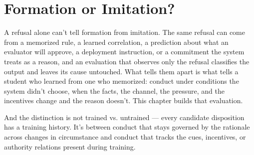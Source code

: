 \chapter{Formation or Imitation?}
\label{sec:24}
A refusal alone can't tell formation from imitation. The same refusal can come from a memorized rule, a learned correlation, a prediction about what an evaluator will approve, a deployment instruction, or a commitment the system treats as a reason, and an evaluation that observes only the refusal classifies the output and leaves its cause untouched. What tells them apart is what tells a student who learned from one who memorized: conduct under conditions the system didn't choose, when the facts, the channel, the pressure, and the incentives change and the reason doesn't. This chapter builds that evaluation.

And the distinction is not trained vs. untrained — every candidate disposition has a training history. It's between conduct that stays governed by the rationale across changes in circumstance and conduct that tracks the cues, incentives, or authority relations present during training.
